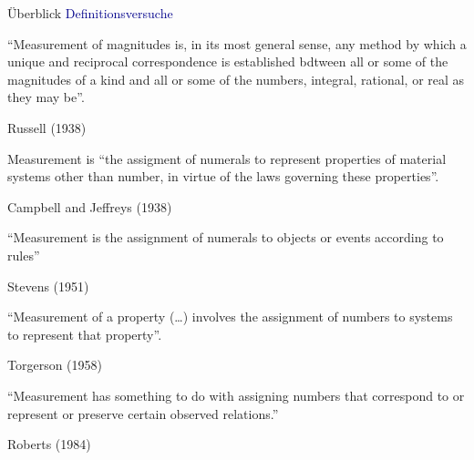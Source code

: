 \documentclass[
  8pt,
  ignorenonframetext,
]{beamer}
\begin{document}
\begin{frame}{Überblick}
\protect\hypertarget{uxfcberblick-1}{}
\textcolor{darkblue}{Definitionsversuche}

\small
\justifying

``Measurement of magnitudes is, in its most general sense, any method by
which a unique and reciprocal correspondence is established bdtween all
or some of the magnitudes of a kind and all or some of the numbers,
integral, rational, or real as they may be''. \vspace{-1mm}

\flushright

Russell (1938)

\justifying

Measurement is ``the assigment of numerals to represent properties of
material systems other than number, in virtue of the laws governing
these properties''. \vspace{-1mm}

\flushright

Campbell and Jeffreys (1938)

\justifying

``Measurement is the assignment of numerals to objects or events
according to rules'' \vspace{-1mm}

\flushright

Stevens (1951)

\justifying

``Measurement of a property (\ldots) involves the assignment of numbers
to systems to represent that property''. \vspace{-1mm}

\flushright

Torgerson (1958)

\justifying

``Measurement has something to do with assigning numbers that correspond
to or represent or preserve certain observed relations.'' \vspace{-1mm}

\flushright

Roberts (1984)
\end{frame}
\end{document}
